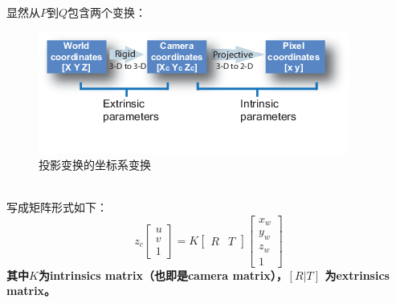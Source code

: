 \documentclass[UTF8]{ctexart}
\begin{document}
显然从$P$到$Q$包含两个变换：
\begin{figure}[htp]%
	\centering  %
	\includegraphics[width=0.8\linewidth]{./figures/calibration_coordinate_blocks.png} %
	\caption{投影变换的坐标系变换\cite{MathWorks18830}}  %
	\label{fig:calibration_coordinate_blocks}   %
\end{figure}\\
写成矩阵形式如下：
\begin{equation}       %
z_c \left[ \begin{array}{c}  u \\ v \\  1 \end{array} \right] =
K \left[ \begin{array}{c|c} R & T   \end{array} \right] \left[ \begin{array}{c}   x_w \\  y_w \\  z_w \\ 1 \end{array}\right]
\end{equation}
\textbf{其中$K$为intrinsics matrix（也即是camera matrix），$[R|T]$ 为extrinsics matrix\cite{wikiCameraresectioning18830}。}
\end{document}
